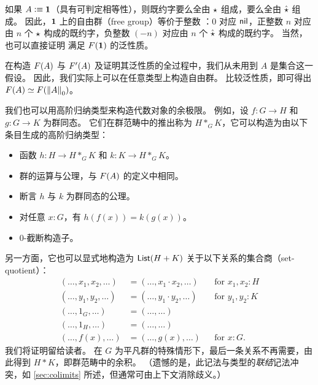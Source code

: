 如果 $A\defeq \unit$（具有可判定相等性），则既约字要么全由 $\ttt$ 组成，要么全由 $\hat{\ttt}$ 组成。
因此，$\unit$ 上的自由群（free group）等价于整数 \Z：$0$ 对应 $\nil$，正整数 $n$ 对应由 $n$ 个 $\ttt$ 构成的既约字，负整数 $(-n)$ 对应由 $n$ 个 $\hat{\ttt}$ 构成的既约字。
当然，也可以直接证明 \Z 满足 $\freegroup{\unit}$ 的泛性质。

\begin{rmk}\label{thm:freegroup-nonset}
  在构造 $\freegroup{A}$ 与 $\freegroupx{A}$ 及证明其泛性质的全过程中，我们从未用到 $A$ 是集合这一假设。
  因此，我们实际上可以在任意类型上构造自由群。
  比较泛性质，即可得出 $\eqv{\freegroup{A}}{\freegroup{\trunc0A}}$。
\end{rmk}

%

%
我们也可以用高阶归纳类型来构造代数对象的余极限。
例如，设 $f:G\to H$ 和 $g:G\to K$ 为群同态。
它们在群范畴中的推出称为
%
%
$H *_G K$，它可以构造为由以下条目生成的高阶归纳类型：


\begin{itemize}
\item 函数 $h:H\to H *_G K$ 和 $k:K\to H *_G K$。
\item 群的运算与公理，与 $\freegroup{A}$ 的定义中相同。
\item 断言 $h$ 与 $k$ 为群同态的公理。
\item 对任意 $x:G$，有 $h(f(x)) = k(g(x))$。
\item $0$-截断构造子。
\end{itemize}


另一方面，它也可以显式地构造为 $\lst{H+K}$ 关于以下关系的集合商（set-quotient）：\begin{align*}
  (\dots, x_1, x_2, \dots) &= (\dots, x_1\cdot x_2, \dots)
  & &\text{for $x_1,x_2:H$}\\
  (\dots, y_1, y_2, \dots) &= (\dots, y_1\cdot y_2, \dots)
  & &\text{for $y_1,y_2:K$}\\
  (\dots, 1_G, \dots) &= (\dots, \dots) &&  \\
  (\dots, 1_H, \dots) &= (\dots, \dots) &&  \\
  (\dots, f(x), \dots) &= (\dots, g(x), \dots)
  & &\text{for $x:G$.}
\end{align*}
我们将证明留给读者。
在 $G$ 为平凡群的特殊情形下，最后一条关系不再需要，由此得到
%
$H*K$，即群范畴中的余积。
（遗憾的是，此记法与类型的\emph{联结}记法冲突，如 \cref{sec:colimits} 所述，但通常可由上下文消除歧义。）

